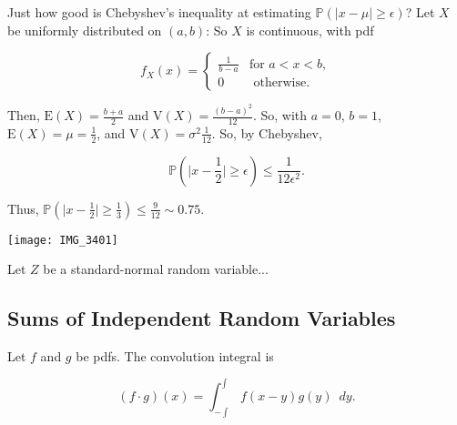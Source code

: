 \documentclass[12pt]{article}
\newcommand{\prob}[1]{\mathbb{P}(#1)}
\newcommand{\nspace}{\vspace*{.5cm}}
\newcommand{\nline}{\nspace \noindent}
\newcommand{\expected}[1]{\text{E}(#1)}
\newcommand{\variance}[1]{\text{V}(#1)}
\begin{document}
\nline
Just how good is Chebyshev's inequality at estimating $\prob{\lvert x - \mu \rvert \geq \epsilon}$? Let $X$ be uniformly distributed on $(a,b)$: So $X$ is continuous, with pdf 

\[ f_X(x) =  \begin{cases} 
      \frac{1}{b-a} & \text{for } a < x < b, \\
      0 & \text{ otherwise}.
      \end{cases} \]

\nline
Then, $\expected{X} = \frac{b+a}{2}$ and $\variance{X} = \frac{(b-a)^2}{12}$. So, with $a=0$, $b=1$, $\expected{X} = \mu = \frac{1}{2}$, and $\variance{X} = \sigma^2 \frac{1}{12}$. So, by Chebyshev,

\begin{equation*}
\prob{\lvert x - \frac{1}{2} \rvert \geq \epsilon} \leq \frac{1}{12 \epsilon^2}. 
\end{equation*}

\noindent
Thus, $\prob{\lvert x - \frac{1}{2} \rvert \geq \frac{1}{3}} \leq \frac{9}{12} \sim 0.75$. 


\texttt{[image: IMG\_3401]}


\begin{tcolorbox}
Let $Z$ be a standard-normal random variable... %
\end{tcolorbox}

\subsection*{Sums of Independent Random Variables}

\nline
Let $f$ and $g$ be pdfs. The convolution integral is 

\begin{equation*}
(f \cdot g)(x) = \int_{- \int}^{\int} f(x-y) g(y) \enspace dy.
\end{equation*}
\end{document}
